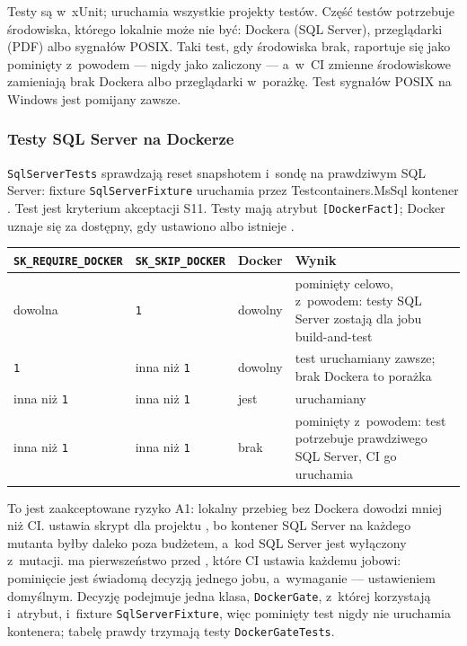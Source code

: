 Testy są w~xUnit;  uruchamia wszystkie projekty testów.
Część testów potrzebuje środowiska, którego lokalnie może nie być: Dockera (SQL Server),
przeglądarki (PDF) albo sygnałów POSIX. Taki test, gdy środowiska brak, raportuje się jako
pominięty z~powodem --- nigdy jako zaliczony --- a~w~CI zmienne środowiskowe zamieniają brak
Dockera albo przeglądarki w~porażkę. Test sygnałów POSIX na Windows jest pomijany zawsze.

\subsubsection{Testy SQL Server na Dockerze}

\texttt{SqlServerTests} sprawdzają reset snapshotem i~sondę na prawdziwym SQL Server:
fixture \texttt{SqlServerFixture} uruchamia przez Testcontainers.MsSql kontener
. Test
 jest kryterium akceptacji S11.
Testy mają atrybut \texttt{[DockerFact]}; Docker uznaje się za dostępny, gdy ustawiono
 albo istnieje .

{\small
\begin{tabularx}{\linewidth}{@{}l l l >{\raggedright\arraybackslash}X@{}}
\toprule
\texttt{SK\_REQUIRE\_DOCKER} & \texttt{SK\_SKIP\_DOCKER} & Docker & Wynik \\
\midrule
dowolna & \texttt{1} & dowolny & pominięty celowo, z~powodem: testy SQL Server
zostają dla jobu build-and-test \\
\texttt{1} & inna niż \texttt{1} & dowolny & test uruchamiany zawsze; brak Dockera to porażka \\
inna niż \texttt{1} & inna niż \texttt{1} & jest & uruchamiany \\
inna niż \texttt{1} & inna niż \texttt{1} & brak & pominięty z~powodem: test potrzebuje
prawdziwego SQL Server, CI go uruchamia \\
\bottomrule
\end{tabularx}
}

To jest zaakceptowane ryzyko A1: lokalny przebieg bez Dockera dowodzi mniej niż CI.
 ustawia skrypt  dla projektu
, bo kontener SQL Server na każdego mutanta byłby daleko poza
budżetem, a~kod SQL Server jest wyłączony z~mutacji.  ma
pierwszeństwo przed , które CI ustawia każdemu jobowi:
pominięcie jest świadomą decyzją jednego jobu, a~wymaganie --- ustawieniem domyślnym.
Decyzję podejmuje jedna klasa, \texttt{DockerGate}, z~której korzystają i~atrybut,
i~fixture \texttt{SqlServerFixture}, więc pominięty test nigdy nie uruchamia kontenera;
tabelę prawdy trzymają testy \texttt{DockerGateTests}.

